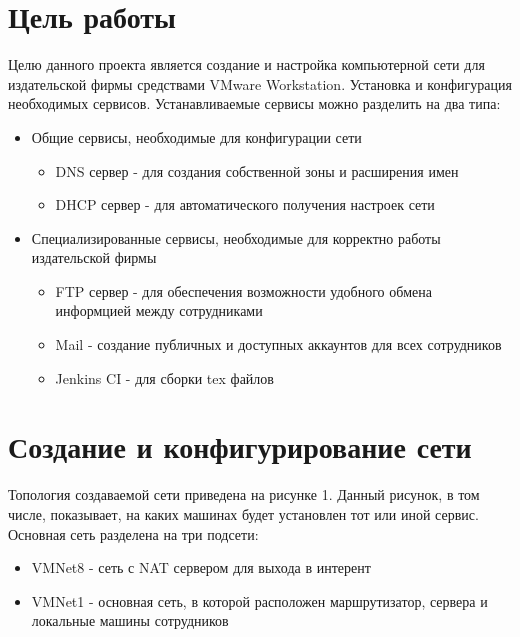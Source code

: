 






\section{Цель работы}
Целю данного проекта является создание и настройка компьютерной сети для издательской фирмы средствами VMware Workstation. Установка и конфигурация необходимых сервисов. Устанавливаемые сервисы можно разделить на два типа:
\begin{itemize}  
\item Общие сервисы, необходимые для конфигурации сети 
\begin{itemize}
\item DNS сервер - для создания собственной зоны и расширения имен
\item DHCP сервер - для автоматического получения настроек сети
\end{itemize}
\item Специализированные сервисы, необходимые для корректно работы издательской фирмы
\begin{itemize}
\item FTP сервер - для обеспечения возможности удобного обмена информцией между сотрудниками  
\item Mail - создание публичных и доступных аккаунтов для всех сотрудников
\item Jenkins CI - для сборки tex файлов
\end{itemize}
\end{itemize}

\section{Создание и конфигурирование сети}
Топология создаваемой сети приведена на рисунке 1. Данный рисунок, в том числе, показывает, на каких машинах будет установлен тот или иной сервис. Основная сеть разделена на три подсети:
\begin{itemize}
\item VMNet8 - сеть с NAT сервером для выхода в интерент
\item VMNet1 - основная сеть, в которой расположен маршрутизатор, сервера и локальные машины сотрудников
\end{itemize}

